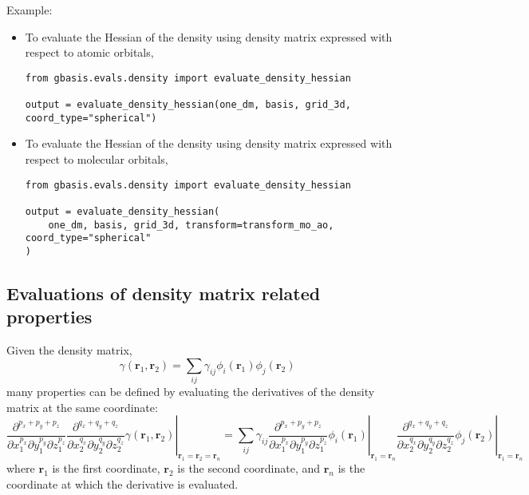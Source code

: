 \documentclass[letterpaper]{article}
\begin{document}
Example:
\begin{itemize}
\item To evaluate the Hessian of the density using density matrix expressed
  with respect to atomic orbitals,
  \begin{lstlisting}[xleftmargin=-25pt]
from gbasis.evals.density import evaluate_density_hessian

output = evaluate_density_hessian(one_dm, basis, grid_3d, coord_type="spherical")
\end{lstlisting}
\item To evaluate the Hessian of the density using density matrix expressed
  with respect to molecular orbitals,
  \begin{lstlisting}[xleftmargin=-25pt]
from gbasis.evals.density import evaluate_density_hessian

output = evaluate_density_hessian(
    one_dm, basis, grid_3d, transform=transform_mo_ao, coord_type="spherical"
)
\end{lstlisting}
\end{itemize}
\subsection{Evaluations of density matrix related properties}
Given the density matrix,
\begin{equation}
  \gamma(\mathbf{r}_1, \mathbf{r}_2)
  = \sum_{ij} \gamma_{ij} \phi_i(\mathbf{r}_1) \phi_j(\mathbf{r}_2)
\end{equation}
many properties can be defined by evaluating the derivatives of the density
matrix at the same coordinate:
\begin{equation}
  \left.
    \frac{\partial^{p_x + p_y + p_z}}{\partial x_1^{p_x} \partial y_1^{p_y} \partial z_1^{p_z}}
    \frac{\partial^{q_x + q_y + q_z}}{\partial x_2^{q_x} \partial y_2^{q_y} \partial z_2^{q_z}}
    \gamma(\mathbf{r}_1, \mathbf{r}_2)
  \right|_{\mathbf{r}_1 = \mathbf{r}_2 = \mathbf{r}_n} =
  \sum_{ij} \gamma_{ij}
  \left.
    \frac{\partial^{p_x + p_y + p_z}}{\partial x_1^{p_x} \partial y_1^{p_y} \partial z_1^{p_z}}
    \phi_i(\mathbf{r}_1)
  \right|_{\mathbf{r}_1 = \mathbf{r}_n}
  \left.
    \frac{\partial^{q_x + q_y + q_z}}{\partial x_2^{q_x} \partial y_2^{q_y} \partial z_2^{q_z}}
    \phi_j(\mathbf{r}_2)
  \right|_{\mathbf{r}_1 = \mathbf{r}_n}
\end{equation}
where $\mathbf{r}_1$ is the first coordinate, $\mathbf{r}_2$ is the second
coordinate, and $\mathbf{r}_n$ is the coordinate at which the derivative is
evaluated.
\end{document}
